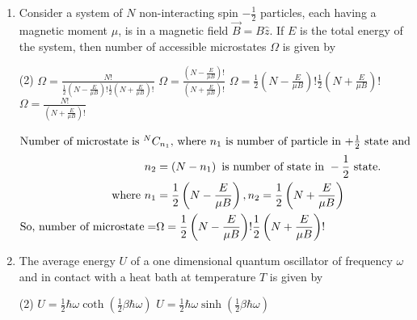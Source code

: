 \begin{enumerate}
	\begin{tasks}(4)
		\task[\textbf{A.}] Zero
		\task[\textbf{B.}]  $N k$
		\task[\textbf{C.}]  $\frac{1}{2} N k$
		\task[\textbf{D.}] $N k \ln (2)$
	\end{tasks}
	\begin{answer}
		There are two microstates possible for spin $\frac{1}{2}$ particle, so entropy is given by $N k \ln (2)$\\\\
		So the correct answer is \textbf{Option (D)}
	\end{answer}	
	\item Consider a system of $N$ non-interacting spin $-\frac{1}{2}$ particles, each having a magnetic moment $\mu$, is in a magnetic field $\vec{B}=B \hat{z} .$ If $E$ is the total energy of the system, then number of accessible microstates $\Omega$ is given by
	{}
	\begin{tasks}(2)
		\task[\textbf{A.}] $\Omega=\frac{N !}{\frac{1}{2}\left(N-\frac{E}{\mu B}\right) ! \frac{1}{2}\left(N+\frac{E}{\mu B}\right) !}$
		\task[\textbf{B.}] $\Omega=\frac{\left(N-\frac{E}{\mu B}\right) !}{\left(N+\frac{E}{\mu B}\right) !}$
		\task[\textbf{C.}] $\Omega=\frac{1}{2}\left(N-\frac{E}{\mu B}\right) ! \frac{1}{2}\left(N+\frac{E}{\mu B}\right) !$
		\task[\textbf{D.}] $\Omega=\frac{N !}{\left(N+\frac{E}{\mu B}\right) !}$
	\end{tasks}
	\begin{answer}
		\begin{align*}
		\intertext{Number of microstate is ${ }^{N} C_{n_{1}}$, where $n_{1}$ is number of particle in $+\frac{1}{2}$ state and}
		n_{2}&=\left(N-n_{1}\right)\text{ is number of state in }-\frac{1}{2}\text{ state.}\\
		\text{	where }n_{1}&=\frac{1}{2}\left(N-\frac{E}{\mu B}\right), n_{2}=\frac{1}{2}\left(N+\frac{E}{\mu B}\right)\\
		\text{So, number of microstate}=&\Omega=\frac{1}{2}\left(N-\frac{E}{\mu B}\right) ! \frac{1}{2}\left(N+\frac{E}{\mu B}\right) !
		\end{align*}
	\end{answer}	
	\item The average energy $U$ of a one dimensional quantum oscillator of frequency $\omega$ and in contact with a heat bath at temperature $T$ is given by
	{}
	\begin{tasks}(2)
		\task[\textbf{A.}] $U=\frac{1}{2} \hbar \omega \operatorname{coth}\left(\frac{1}{2} \beta \hbar \omega\right)$
		\task[\textbf{B.}] $U=\frac{1}{2} \hbar \omega \sinh \left(\frac{1}{2} \beta \hbar \omega\right)$

\end{tasks}
\end{enumerate}
